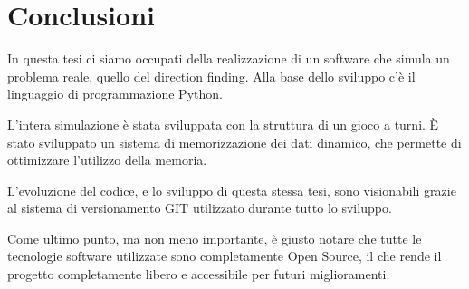 \chapter*{Conclusioni}
In questa tesi ci siamo occupati della realizzazione di un software che simula un problema reale, quello del direction finding. Alla base dello sviluppo c'è il linguaggio di programmazione Python.

L'intera simulazione è stata sviluppata con la struttura di un gioco a turni.
È stato sviluppato un sistema di memorizzazione dei dati dinamico, che permette di ottimizzare l'utilizzo della memoria.

L'evoluzione del codice, e lo sviluppo di questa stessa tesi, sono visionabili grazie al sistema di versionamento GIT utilizzato durante tutto lo sviluppo.

Come ultimo punto, ma non meno importante, è giusto notare che tutte le tecnologie software utilizzate sono completamente Open Source, il che rende il progetto completamente libero e accessibile per futuri miglioramenti.